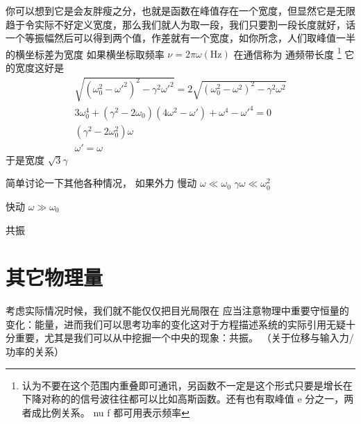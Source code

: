 \documentclass[11pt]{book}
\begin{document}
你可以想到它是会友胖瘦之分，也就是函数在峰值存在一个宽度，但显然它是无限趋于令实际不好定义宽度，那么我们就人为取一段，我们只要割一段长度就好，话一个等振幅然后可以得到两个值，作差就有一个宽度，如你所念，人们取峰值一半的横坐标差为宽度
如果横坐标取频率 \(\nu =2\pi\omega(\mathrm{Hz})\) 在通信称为
通频带长度
\footnote{认为不要在这个范围内重叠即可通讯，另函数不一定是这个形式只要是增长在下降对称的的信号波往往都可以比如高斯函数。还有也有取峰值 e 分之一，两者成比例关系。 nu f 都可用表示频率}
它的宽度这好是
\begin{align}
\label{eq:79}
\sqrt{(\omega_0^2-\omega'^2)^2-\gamma^2\omega'^2}=2\sqrt{(\omega_0^2-\omega^2)^2-\gamma^2\omega^2}\\
3\omega_0^4+(\gamma^2-2\omega_0)(4\omega^2-\omega')+\omega^4-\omega'^4=0 \\
(\gamma^2-2\omega_0^2)\omega \\
\omega'=\omega
\end{align}
于是宽度 \(\sqrt{3}\gamma\)

简单讨论一下其他各种情况，
如果外力
慢动 \(\omega\ll \omega_0\)
\(\gamma\omega\ll \omega_0^2\)

快动 \(\omega\gg \omega_0\)

共振

\section{其它物理量}
\label{sec:org887cea5}
考虑实际情况时候，我们就不能仅仅把目光局限在
应当注意物理中重要守恒量的变化：能量，进而我们可以思考功率的变化这对于方程描述系统的实际引用无疑十分重要，尤其是我们可以从中挖掘一个中央的现象：共振。
（关于位移与输入力/功率的关系）
\end{document}
